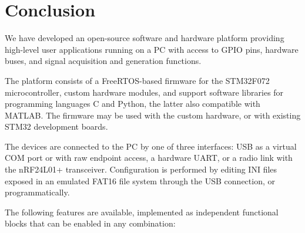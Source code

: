 \chapter{Conclusion}

We have developed an open-source software and hardware platform providing high-level user applications running on a \gls{PC} with access to \gls{GPIO} pins, hardware buses, and signal acquisition and generation functions.

The platform consists of a FreeRTOS-based firmware for the STM32F072 microcontroller, custom hardware modules, and support software libraries for programming languages C and Python, the latter also compatible with MATLAB. The firmware may be used with the custom hardware, or with existing STM32 development boards.

The devices are connected to the \gls{PC} by one of three interfaces: \gls{USB} as a virtual COM port or with raw endpoint access, a hardware \gls{UART}, or a radio link with the nRF24L01+ transceiver. Configuration is performed by editing INI files exposed in an emulated FAT16 file system through the \gls{USB} connection, or programmatically.

\noindent
The following features are available, implemented as independent functional blocks that can be enabled in any combination:

